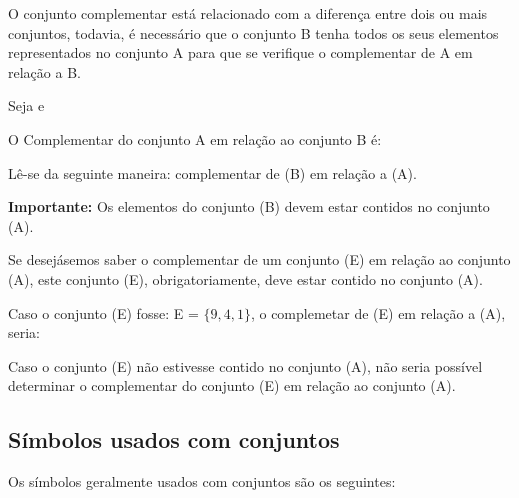 \begin{multicols*}{2}
       O conjunto complementar está relacionado com a diferença entre dois ou mais conjuntos, todavia, é necessário que o conjunto B tenha todos os seus elementos representados no conjunto A para que se verifique o complementar de A em relação a B.

		Seja  e 
		
		O Complementar do conjunto A em relação ao conjunto B é:
		       
        
        Lê-se da seguinte maneira: complementar de (B) em relação a (A).
        
        \textbf{Importante:} Os elementos do conjunto (B) devem estar contidos no conjunto (A).
        
        Se desejásemos saber o complementar de um conjunto (E) em relação ao conjunto (A), este conjunto (E), obrigatoriamente, deve estar contido no conjunto (A).
        
        Caso o conjunto (E) fosse: E = $\{9, 4, 1\}$, o complemetar de (E) em relação a (A), seria:
        
        
        Caso o conjunto (E) não estivesse contido no conjunto (A), não seria possível determinar o complementar do conjunto (E) em relação ao conjunto (A).
       
		\subsection{Símbolos usados com conjuntos}  		       
       
        Os símbolos geralmente usados com conjuntos são os seguintes:\\
        
        
        
        
        
        
        

\end{multicols*}
